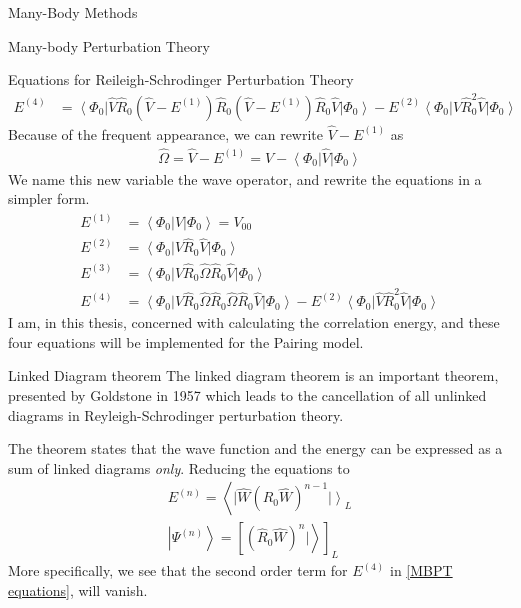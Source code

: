 \documentclass[twoside,english]{uiofysmaster}
\begin{document}
\begin{chapter}{Many-Body Methods}
\begin{section}{Many-body Perturbation Theory}
\begin{subsection}{Equations for Reileigh-Schrodinger Perturbation Theory}
\begin{align*}
	 			E^{(4)} &= \left< \Phi_0 \right| \hat V \hat R_0 (\hat V - E^{(1)})  \hat R_0 (\hat V - E^{(1)}) \hat R_0 \hat V \left| \Phi_0 \right> 
	 					- E^{(2)} \left< \Phi_0 \right| \hat V \hat R_0^2 \hat V \left| \Phi_0 \right>
	  		\end{align*}
	  		Because of the frequent appearance, we can rewrite $\hat V - E^{(1)}$ as
	  		\begin{align}
	  			\hat \Omega = \hat V - E^{(1)} = \hat V - \left< \Phi_0 \right| \hat V \left| \Phi_0 \right>
	  		\end{align}
	  		We name this new variable the wave operator, and rewrite the equations in a simpler form. 
	  		\begin{align*}
	 			E^{(1)} &= \left< \Phi_0 \right| \hat V \left| \Phi_0 \right>  = V_{00}\\
	 			E^{(2)} &= \left< \Phi_0 \right| \hat V \hat R_0 \hat V \left| \Phi_0 \right> \\
	 			E^{(3)} &= \left< \Phi_0 \right| \hat V \hat R_0 \hat \Omega \hat R_0 \hat V \left| \Phi_0 \right> \\
	 			E^{(4)} &= \left< \Phi_0 \right| \hat V \hat R_0 \hat \Omega  \hat R_0 \hat \Omega \hat R_0 \hat V \left| \Phi_0 \right> 
	 					- E^{(2)} \left< \Phi_0 \right| \hat V \hat R_0^2 \hat V \left| \Phi_0 \right>
	 			\label{MBPT equations}
	  		\end{align*}
	  		I am, in this thesis, concerned with calculating the correlation energy, and these four equations will be implemented for the Pairing model. 
	 	\end{subsection}
	\end{section}

	\begin{section}{Linked Diagram theorem}
		The linked diagram theorem is an important theorem, presented by Goldstone in 1957 \cite{ShavittAndBartlett,Goldstone} which leads to the cancellation of all unlinked diagrams in Reyleigh-Schrodinger perturbation theory.

		The theorem states that the wave function and the energy can be expressed as a sum of linked diagrams \textit{only}. Reducing the equations to 
		\begin{align}
			E^{(n)} = \left< \right. | \hat W (\hat R_0 \hat W)^{n-1} \left. | \right>_L \\
			\left| \Psi^{(n)} \right> = \left[ (\hat R_0 \hat W)^n |\left.\right>  \right]_L
		\end{align}
		More specifically, we see that the second order term for $E^{(4)}$ in \ref{MBPT equations}, will vanish. 


\end{section}
\end{chapter}
\end{document}
